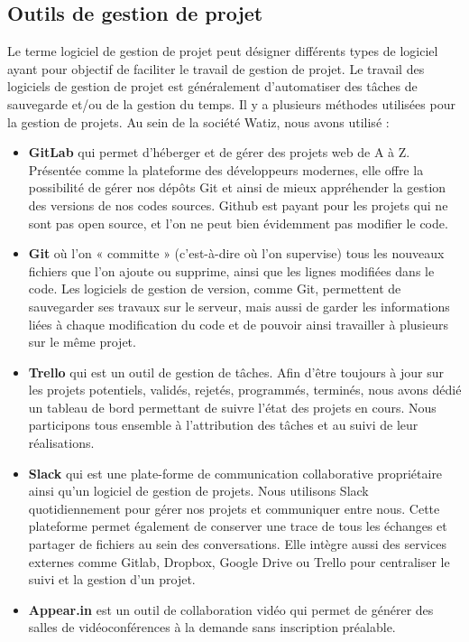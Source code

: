 \documentclass[a4paper, 12pt]{report}
\begin{document}
\subsection{Outils de gestion de projet}
Le terme logiciel de gestion de projet peut désigner différents types de logiciel ayant pour objectif de faciliter le travail de gestion de projet. Le travail des logiciels de gestion de projet est généralement d'automatiser des tâches de sauvegarde et/ou de la gestion du temps.
Il y a plusieurs méthodes utilisées pour la  gestion de projets. Au sein de la société Watiz, nous avons utilisé :

\begin{itemize}
\item \textbf{GitLab}
qui permet d’héberger et de gérer des projets web de A à Z. Présentée comme la plateforme des développeurs modernes, elle offre la possibilité de gérer nos dépôts Git et ainsi de mieux appréhender la gestion des versions de nos codes sources.
Github est payant pour les projets qui ne sont pas open source, et l'on ne peut bien évidemment pas modifier le code.

\item \textbf{Git}
où l'on « committe » (c'est-à-dire où l'on supervise) tous les nouveaux fichiers que l’on ajoute ou supprime, ainsi que les lignes modifiées dans le code. 
Les logiciels de gestion de version, comme Git, permettent de sauvegarder ses travaux sur le serveur, mais aussi de garder les informations liées à chaque modification du code et de pouvoir ainsi travailler à plusieurs sur le même projet.

\item \textbf{Trello}
qui est un outil de gestion de tâches. Afin d’être toujours à jour sur les projets potentiels, validés, rejetés, programmés, terminés, nous avons dédié un tableau de bord permettant de suivre l’état des projets en cours. Nous participons tous ensemble à l'attribution des tâches et au suivi de leur réalisations.
\item \textbf{Slack} qui est une plate-forme de communication collaborative propriétaire ainsi qu'un logiciel de gestion de projets. Nous utilisons Slack quotidiennement pour gérer nos projets et communiquer entre nous. 
Cette plateforme permet également de conserver une trace de tous les échanges et partager de fichiers au sein des conversations. Elle intègre  aussi des services externes comme Gitlab, Dropbox, Google Drive ou Trello pour centraliser le suivi et la gestion d'un projet.
\item \textbf{Appear.in} est un outil de collaboration vidéo qui permet de générer des salles de vidéoconférences à la demande sans inscription préalable.
\end{itemize} 
\end{document}
